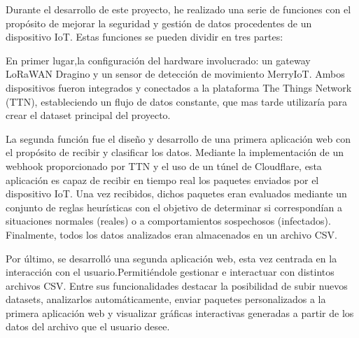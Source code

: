 
Durante el desarrollo de este proyecto, he realizado una serie de funciones con el propósito de mejorar la seguridad y gestión de datos procedentes de un dispositivo IoT. Estas funciones se pueden dividir en tres partes:

En primer lugar,la configuración del hardware involucrado: un gateway LoRaWAN Dragino y un sensor de detección de movimiento MerryIoT. Ambos dispositivos fueron integrados y conectados a la plataforma The Things Network (TTN), estableciendo un flujo de datos constante, que mas tarde utilizaría para crear el dataset principal del proyecto.

La segunda función fue el diseño y desarrollo de una primera aplicación web con el propósito de recibir y clasificar los datos. Mediante la implementación de un webhook proporcionado por TTN y el uso de un túnel de Cloudflare, esta aplicación es capaz de recibir en tiempo real los paquetes enviados por el dispositivo IoT. Una vez recibidos, dichos paquetes eran evaluados mediante un conjunto de reglas heurísticas con el objetivo de determinar si correspondían a situaciones normales (reales) o a comportamientos sospechosos (infectados). Finalmente, todos los datos analizados eran almacenados en un archivo CSV.

Por último, se desarrolló una segunda aplicación web, esta vez centrada en la interacción con el usuario.Permitiéndole gestionar e interactuar con distintos archivos CSV. Entre sus funcionalidades destacar la posibilidad de subir nuevos datasets, analizarlos automáticamente, enviar paquetes personalizados a la primera aplicación web y visualizar gráficas interactivas generadas a partir de los datos del archivo que el usuario desee.


